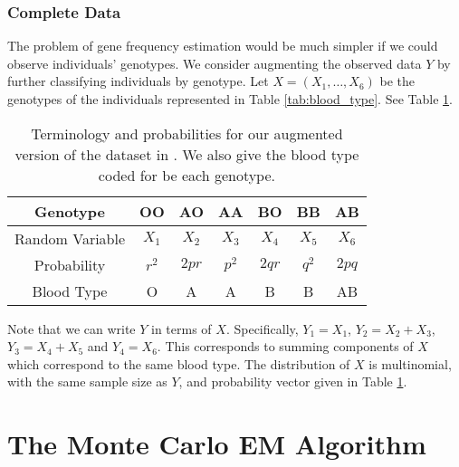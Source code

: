 \documentclass[11pt, oneside]{article}   	%
\begin{document}
\subsubsection{Complete Data}

The problem of gene frequency estimation would be much simpler if we could observe individuals' genotypes. We consider augmenting the observed data $Y$ by further classifying individuals by genotype. Let $X = (X_1, \ldots, X_6)$ be the genotypes of the individuals represented in Table \ref{tab:blood_type}. See Table \ref{tab:blood_type_complete}.

\begin{table}
    \centering
    \caption{Terminology and probabilities for our augmented version of the dataset in \citet{Fuj78}. We also give the blood type coded for be each genotype.}
    \begin{tabular}{c|cccccc}
        Genotype & OO & AO & AA & BO & BB & AB\\
        \hline
        Random Variable & $X_1$ & $X_2$ & $X_3$ & $X_4$ & $X_5$ & $X_6$\\
        Probability & $r^2$ & $2pr$ & $p^2$ & $2qr$ & $q^2$ & $2pq$\\
        Blood Type & O & A & A & B & B & AB
    \end{tabular}
    
    \label{tab:blood_type_complete}
\end{table}

Note that we can write $Y$ in terms of $X$. Specifically, $Y_1 = X_1$, $Y_2 = X_2 + X_3$, $Y_3 = X_4 + X_5$ and $Y_4 = X_6$. This corresponds to summing components of $X$ which correspond to the same blood type. The distribution of $X$ is multinomial, with the same sample size as $Y$, and probability vector given in Table \ref{tab:blood_type_complete}.




\section{The Monte Carlo EM Algorithm}
\end{document}
